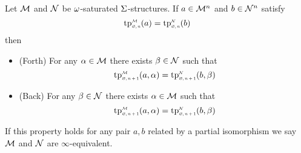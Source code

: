 \begin{prop}
    Let $\mathcal{M}$ and $\mathcal{N}$ be $\omega$-saturated $\Sigma$-structures.
    If $a \in \mathcal{M}^n$ and $b \in \mathcal{N}^n$ satisfy
    \[\subintp{\nothing,n}{\MM}{\tp}(a) = 
    \subintp{\nothing,n}{\NN}{\tp}(b)\]
    then 
    \begin{itemize}
        \item (Forth) For any $\alpha \in \mathcal{M}$ there exists $\beta \in \mathcal{N}$ such that
        \[\subintp{\nothing,n+1}{\MM}{\tp}(a,\al) = 
        \subintp{\nothing,n+1}{\NN}{\tp}(b,\be)\]
        \item (Back) For any $\beta \in \mathcal{N}$ there exists $\alpha \in \mathcal{M}$ such that
        \[\subintp{\nothing,n+1}{\MM}{\tp}(a,\al) = 
        \subintp{\nothing,n+1}{\NN}{\tp}(b,\be)\]
    \end{itemize}
    If this property holds for any pair $a,b$ related by a partial isomorphism
    we say $\mathcal{M}$ and $\mathcal{N}$ are $\infty$-equivalent.
\end{prop}
